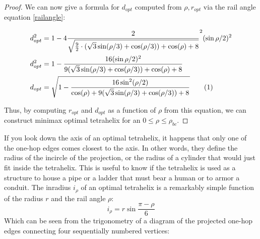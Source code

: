 \documentclass[11pt]{article}
\newcommand\numberthis{\addtocounter{equation}{1}\tag{\theequation}}
\begin{document}
\begin{proof}
We can now give a formula for $ d_{opt} $ computed from $\rho, r_{opt}$ via the rail angle equation \eqref{railangle}:

\begin{align*}
  d_{opt}^2 &= 1 - 4 \frac{2}{\sqrt{\frac{9}{2} \cdot ( \sqrt{3} \sin(\rho/3) + \cos(\rho/3)) + \cos(\rho)+ 8 }}^2 (\sin{ \rho / 2})^2   \\
  d_{opt}^2 &= 1 - \frac{16(\sin{ \rho / 2})^2}{9 ( \sqrt{3} \sin(\rho/3) + \cos(\rho/3)) + \cos(\rho)+ 8 }    \\
    d_{opt} &= \sqrt{1 - \frac{16 \sin^2(\rho / 2) }{ \cos(\rho) + 9( \sqrt{3} \sin(\rho/3) + \cos(\rho/3)) + 8 }}    \numberthis  \label{dopt}  \\      
\end{align*}

Thus, by computing $r_{opt}$  and $d_{opt}$ as a function of $\rho$ from this equation, we can construct minimax optimal tetrahelix for an $0 \leq \rho \leq \rho_{bc}$.
\end{proof}

If you look down the axis of an optimal tetrahelix, it happens that only one of the one-hop edges
comes closest to the axis. In other words, they define the radius of the incircle of the
projection, or the radius of a cylinder that would just fit inside the tetrahelix.
This is useful to know if the tetrahelix is used as a structure to house a pipe or
a ladder that must bear a human or to armor a conduit. The inradius $i_\rho$ of
an optimal tetrahelix is a remarkably simple function of the radius $r$ and the rail angle $\rho$:
\begin{equation}
  \label{eq:inradius}
  i_{\rho} = r \sin{\frac{\pi - \rho}{6}}
\end{equation}
Which can be seen from the trigonometry of a diagram of the projected one-hop edges
connecting four sequentially numbered vertices:
\end{document}
